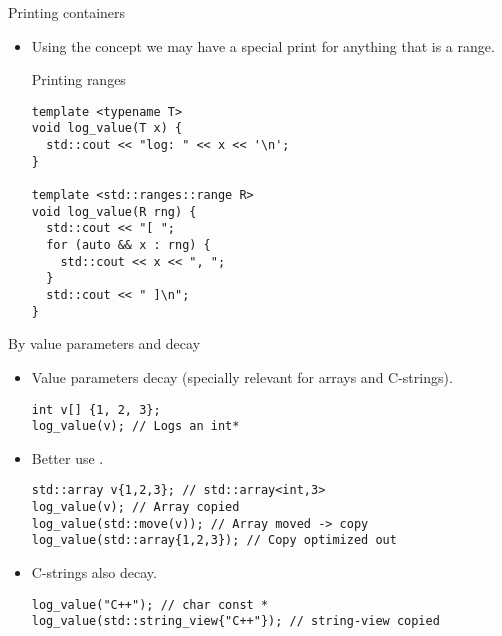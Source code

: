 \begin{frame}[t,fragile]{Printing containers}
\begin{itemize}
  \item Using the concept  we may have a special print
        for anything that is a range.

\begin{block}{Printing ranges}
\begin{lstlisting}
template <typename T>
void log_value(T x) {
  std::cout << "log: " << x << '\n';
}

template <std::ranges::range R>
void log_value(R rng) {
  std::cout << "[ ";
  for (auto && x : rng) {
    std::cout << x << ", ";
  }
  std::cout << " ]\n";
}
\end{lstlisting}
\end{block}
\end{itemize}
\end{frame}


\begin{frame}[t,fragile]{By value parameters and decay}
\begin{itemize}
  \item Value parameters decay (specially relevant for arrays and C-strings).
\begin{lstlisting}
int v[] {1, 2, 3};
log_value(v); // Logs an int*
\end{lstlisting}

  \item Better use .
\begin{lstlisting}
std::array v{1,2,3}; // std::array<int,3>
log_value(v); // Array copied
log_value(std::move(v)); // Array moved -> copy
log_value(std::array{1,2,3}); // Copy optimized out
\end{lstlisting}

  \item C-strings also decay.
\begin{lstlisting}
log_value("C++"); // char const *
log_value(std::string_view{"C++"}); // string-view copied
\end{lstlisting}
\end{itemize}
\end{frame}

